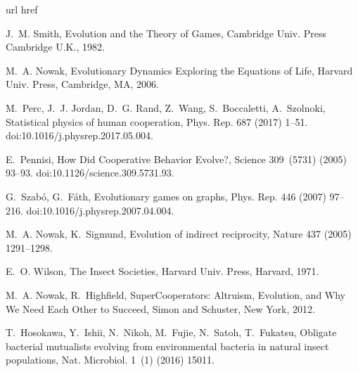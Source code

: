 \documentclass[5p]{elsarticle}
\begin{document}
\begin{thebibliography}{10}
\expandafter\ifx\csname url\endcsname\relax
  \def\url#1{\texttt{#1}}\fi
\expandafter\ifx\csname href\endcsname\relax
  \def\href#1#2{#2} \def\path#1{#1}\fi

J.~M. Smith,
  \href{https://books.google.com.br/books?id=Nag2IhmPS3gC{\&}printsec=frontcover{\&}dq=isbn:9780521288842{\&}hl=pt-BR{\&}sa=X{\&}ved=0ahUKEwjw6eHkvePRAhVEiZAKHYOfAcYQ6AEIHDAA{\#}v=onepage{\&}q{\&}f=false}{{Evolution
  and the Theory of Games}}, Cambridge Univ. Press Cambridge U.K., 1982.

M.~A. Nowak,
  \href{http://www.hup.harvard.edu/catalog.php?isbn=9780674023383}{{Evolutionary
  Dynamics Exploring the Equations of Life}}, Harvard Univ. Press, Cambridge,
  MA, 2006.

M.~Perc, J.~J. Jordan, D.~G. Rand, Z.~Wang, S.~Boccaletti, A.~Szolnoki,
  \href{http://dx.doi.org/10.1016/j.physrep.2017.05.004
  http://linkinghub.elsevier.com/retrieve/pii/S0370157317301424}{{Statistical
  physics of human cooperation}}, Phys. Rep. 687 (2017) 1--51.
  \href {https://doi.org/10.1016/j.physrep.2017.05.004}
  {\path{doi:10.1016/j.physrep.2017.05.004}}.

E.~Pennisi, \href{http://www.sciencemag.org/cgi/doi/10.1126/science.309.5731.93
  https://www.sciencemag.org/lookup/doi/10.1126/science.309.5731.93}{{How Did
  Cooperative Behavior Evolve?}}, Science 309~(5731) (2005) 93--93.
\newblock \href {https://doi.org/10.1126/science.309.5731.93}
  {\path{doi:10.1126/science.309.5731.93}}.

G.~Szab{\'{o}}, G.~F{\'{a}}th, {Evolutionary games on graphs}, Phys. Rep. 446
  (2007) 97--216.
\href
  {https://doi.org/10.1016/j.physrep.2007.04.004}
  {\path{doi:10.1016/j.physrep.2007.04.004}}.

M.~A. Nowak, K.~Sigmund, {Evolution of indirect reciprocity}, Nature 437 (2005)
  1291--1298.

E.~O. Wilson, {The Insect Societies}, Harvard Univ. Press, Harvard, 1971.

M.~A. Nowak, R.~Highfield, {SuperCooperators: Altruism, Evolution, and Why We
  Need Each Other to Succeed}, Simon and Schuster, New York, 2012.

T.~Hosokawa, Y.~Ishii, N.~Nikoh, M.~Fujie, N.~Satoh, T.~Fukatsu, Obligate
  bacterial mutualists evolving from environmental bacteria in natural insect
  populations, Nat. Microbiol. 1~(1) (2016) 15011.


\end{thebibliography}
\end{document}
